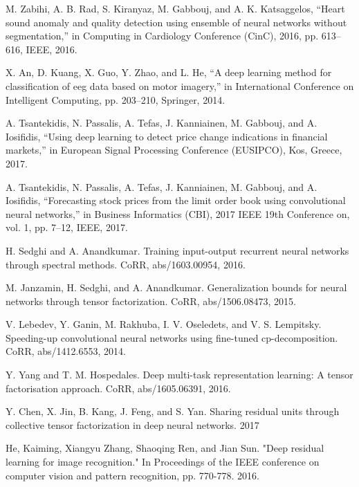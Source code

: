 \documentclass{report}
\begin{document}
\begin{thebibliography}{1}
	
	M. Zabihi, A. B. Rad, S. Kiranyaz, M. Gabbouj, and A. K. Katsaggelos,
	“Heart sound anomaly and quality detection using ensemble of neural
	networks without segmentation,” in Computing in Cardiology Conference (CinC), 2016, pp. 613–616, IEEE, 2016.
	
	X. An, D. Kuang, X. Guo, Y. Zhao, and L. He, “A deep learning method
	for classification of eeg data based on motor imagery,” in International
	Conference on Intelligent Computing, pp. 203–210, Springer, 2014.
	
	A. Tsantekidis, N. Passalis, A. Tefas, J. Kanniainen, M. Gabbouj, and
	A. Iosifidis, “Using deep learning to detect price change indications
	in financial markets,” in European Signal Processing Conference (EUSIPCO), Kos, Greece, 2017.

A. Tsantekidis, N. Passalis, A. Tefas, J. Kanniainen, M. Gabbouj, and
	A. Iosifidis, “Forecasting stock prices from the limit order book using
	convolutional neural networks,” in Business Informatics (CBI), 2017
	IEEE 19th Conference on, vol. 1, pp. 7–12, IEEE, 2017.

	
	
	
	H. Sedghi and A. Anandkumar. Training input-output recurrent neural networks through spectral methods. CoRR,
	abs/1603.00954, 2016.
	
	M. Janzamin, H. Sedghi, and A. Anandkumar. Generalization bounds for neural networks through tensor factorization.
	CoRR, abs/1506.08473, 2015.
	
	 V. Lebedev, Y. Ganin, M. Rakhuba, I. V. Oseledets, and
	V. S. Lempitsky. Speeding-up convolutional neural networks
	using fine-tuned cp-decomposition. CoRR, abs/1412.6553,
	2014. 
	
	 Y. Yang and T. M. Hospedales. Deep multi-task representation learning: A tensor factorisation approach. CoRR,
	abs/1605.06391, 2016. 
	
	Y. Chen, X. Jin, B. Kang, J. Feng, and S. Yan. Sharing residual units through collective tensor factorization in deep neural networks. 2017
	
	
	
	He, Kaiming, Xiangyu Zhang, Shaoqing Ren, and Jian Sun. "Deep residual learning for image recognition." In Proceedings of the IEEE conference on computer vision and pattern recognition, pp. 770-778. 2016.
	

\end{thebibliography}
\end{document}
